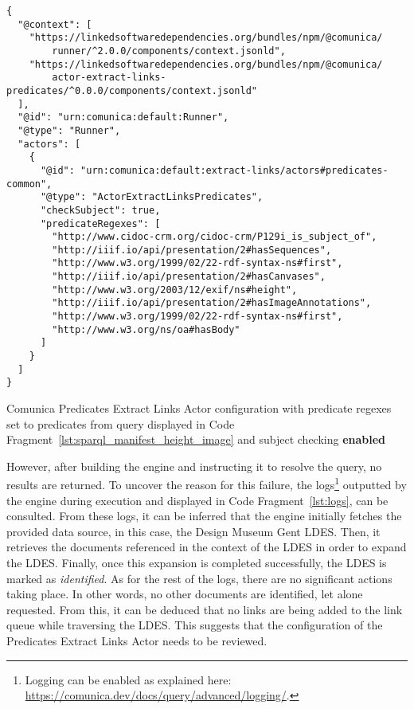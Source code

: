 \begin{listing}[htbp]
    \begin{verbatim}
{
  "@context": [
    "https://linkedsoftwaredependencies.org/bundles/npm/@comunica/
        runner/^2.0.0/components/context.jsonld",
    "https://linkedsoftwaredependencies.org/bundles/npm/@comunica/
        actor-extract-links-predicates/^0.0.0/components/context.jsonld"
  ],
  "@id": "urn:comunica:default:Runner",
  "@type": "Runner",
  "actors": [
    {
      "@id": "urn:comunica:default:extract-links/actors#predicates-common",
      "@type": "ActorExtractLinksPredicates",
      "checkSubject": true,
      "predicateRegexes": [
        "http://www.cidoc-crm.org/cidoc-crm/P129i_is_subject_of",
        "http://iiif.io/api/presentation/2#hasSequences",
        "http://www.w3.org/1999/02/22-rdf-syntax-ns#first",
        "http://iiif.io/api/presentation/2#hasCanvases",
        "http://www.w3.org/2003/12/exif/ns#height",
        "http://iiif.io/api/presentation/2#hasImageAnnotations",
        "http://www.w3.org/1999/02/22-rdf-syntax-ns#first",
        "http://www.w3.org/ns/oa#hasBody"
      ]
    }
  ]
}
    \end{verbatim}
    \caption{Comunica Predicates Extract Links Actor configuration with predicate regexes set to predicates from query displayed in Code Fragment~\ref{lst:sparql_manifest_height_image} and subject checking \textbf{enabled}}
    \label{lst:actor_config_regexes_subject_true}
\end{listing}

However, after building the engine and instructing it to resolve the query, no results are returned. To uncover the reason for this failure, the logs\footnote{Logging can be enabled as explained here: \url{https://comunica.dev/docs/query/advanced/logging/}.} outputted by the engine during execution and displayed in Code Fragment~\ref{lst:logs}, can be consulted. From these logs, it can be inferred that the engine initially fetches the provided data source, in this case, the Design Museum Gent LDES. Then, it retrieves the documents referenced in the context of the LDES in order to expand the LDES. Finally, once this expansion is completed successfully, the LDES is marked as \textit{identified}. As for the rest of the logs, there are no significant actions taking place. In other words, no other documents are identified, let alone requested. From this, it can be deduced that no links are being added to the link queue while traversing the LDES. This suggests that the configuration of the Predicates Extract Links Actor needs to be reviewed.

